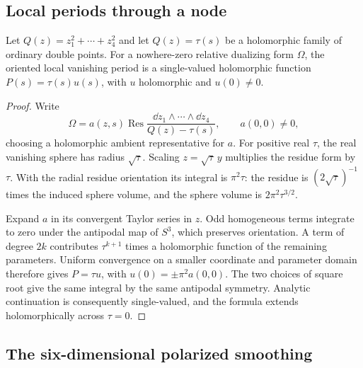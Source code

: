 \subsection{Local periods through a node}

\begin{lemma}\label{lem:local-period}
Let $Q(z)=z_1^2+\cdots+z_4^2$ and let $Q(z)=\tau(s)$ be a
holomorphic family of ordinary double points. For a nowhere-zero
relative dualizing form $\Omega$, the oriented local vanishing
period is a single-valued holomorphic function
$P(s)=\tau(s)u(s)$, with $u$ holomorphic and $u(0)\ne0$.
\end{lemma}
\begin{proof}
Write
\[
 \Omega=a(z,s)\operatorname{Res}
       \frac{\dd z_1\wedge\cdots\wedge\dd z_4}{Q(z)-\tau(s)},
 \qquad a(0,0)\ne0,
\]
choosing a holomorphic ambient representative for $a$. For positive
real $\tau$, the real vanishing sphere has radius $\sqrt\tau$.
Scaling $z=\sqrt\tau\,y$ multiplies the residue form by $\tau$.
With the radial residue orientation its integral is $\pi^2\tau$:
the residue is $(2\sqrt\tau)^{-1}$ times the induced sphere volume,
and the sphere volume is $2\pi^2\tau^{3/2}$.

Expand $a$ in its convergent Taylor series in $z$. Odd homogeneous
terms integrate to zero under the antipodal map of $S^3$, which
preserves orientation. A term of degree $2k$ contributes $\tau^{k+1}$
times a holomorphic function of the remaining parameters. Uniform
convergence on a smaller coordinate and parameter domain therefore
gives $P=\tau u$, with $u(0)=\pm\pi^2a(0,0)$. The two choices
of square root give the same integral by the same antipodal symmetry.
Analytic continuation is consequently single-valued, and the formula
extends holomorphically across $\tau=0$.
\end{proof}

\subsection{The six-dimensional polarized smoothing}

